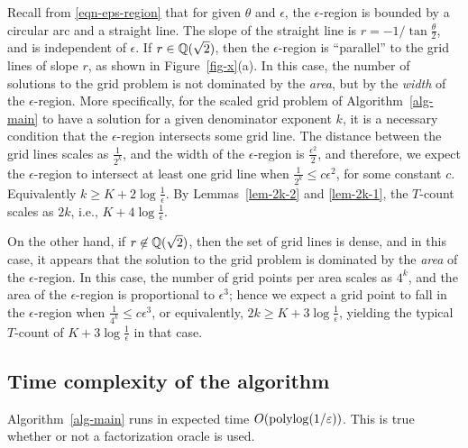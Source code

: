 \documentclass{article}
\begin{document}
Recall from {\eqref{eqn-eps-region}} that for given $\theta$ and
$\epsilon$, the $\epsilon$-region is bounded by a circular arc and a
straight line. The slope of the straight line is
$r=-1/\tan\frac{\theta}{2}$, and is independent of $\epsilon$. If
$r\in{\mathbb{Q}}(\sqrt2)$, then the $\epsilon$-region is ``parallel'' to the
grid lines of slope $r$, as shown in Figure~\ref{fig-x}(a). In this
case, the number of solutions to the grid problem is not dominated by
the {\em area}, but by the {\em width} of the $\epsilon$-region. More
specifically, for the scaled grid problem of Algorithm~\ref{alg-main}
to have a solution for a given denominator exponent $k$, it is a
necessary condition that the $\epsilon$-region intersects some grid
line. The distance between the grid lines scales as $\frac{1}{2^k}$,
and the width of the $\epsilon$-region is $\frac{\epsilon^2}{2}$, and
therefore, we expect the $\epsilon$-region to intersect at least one
grid line when $\frac{1}{2^k}\leq c\epsilon^2$, for some constant
$c$. Equivalently $k\geq K+2\log\frac{1}{\epsilon}$. By
Lemmas~\ref{lem-2k-2} and {\ref{lem-2k-1}}, the $T$-count scales as
$2k$, i.e., $K+4\log\frac{1}{\epsilon}$.

On the other hand, if $r\not\in{\mathbb{Q}}(\sqrt2)$, then the set of grid lines
is dense, and in this case, it appears that the solution to the grid
problem is dominated by the {\em area} of the $\epsilon$-region. In
this case, the number of grid points per area scales as $4^k$, and the
area of the $\epsilon$-region is proportional to $\epsilon^3$; hence
we expect a grid point to fall in the $\epsilon$-region when
$\frac{1}{4^k}\leq c\epsilon^3$, or equivalently,
$2k\geq K+3\log\frac{1}{\epsilon}$, yielding the typical $T$-count of
$K+3\log\frac{1}{\epsilon}$ in that case.

\subsection{Time complexity of the algorithm}

\begin{proposition}[Complexity]\label{prop-time-complexity}
  Algorithm~\ref{alg-main} runs in expected time
  $O(\mathop{\rm polylog}\nolimits(1/\varepsilon))$. This is true whether or not a
  factorization oracle is used.
\end{proposition}
\end{document}
